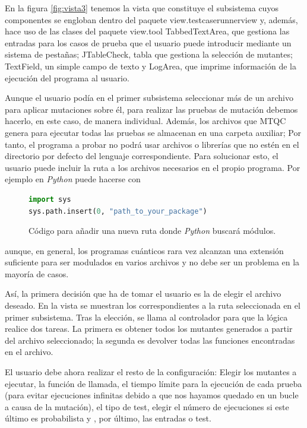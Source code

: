 En la figura \ref{fig:vista3} tenemos la vista que constituye el subsistema cuyos componentes se engloban dentro del paquete view.testcaserunnerview y, además, hace uso de las clases del paquete view.tool TabbedTextArea, que gestiona las entradas para los casos de prueba que el usuario puede introducir mediante un sistema de pestañas; JTableCheck, tabla que gestiona la selección de mutantes; TextField, un simple campo de texto y LogArea, que imprime información de la ejecución del programa al usuario.

Aunque el usuario podía en el primer subsistema seleccionar más de un archivo para aplicar mutaciones sobre él, para realizar las pruebas de mutación debemos hacerlo, en este caso, de manera individual. Además, los archivos que MTQC genera para ejecutar todas las pruebas se almacenan en una carpeta auxiliar; Por tanto, el programa a probar no podrá usar archivos o librerías que no estén en el directorio por defecto del lenguaje correspondiente. Para solucionar esto, el usuario puede incluir la ruta a los archivos necesarios en el propio programa. Por ejemplo en \textit{Python} puede hacerse con

\begin{figure}[htb]
\begin{lstlisting}[language=Python]
import sys
sys.path.insert(0, "path_to_your_package")
\end{lstlisting}
\caption{Código para añadir una nueva ruta donde \textit{Python} buscará módulos.}
\label{fig:code1}
\end{figure}

aunque, en general, los programas cuánticos rara vez alcanzan una extensión suficiente para ser modulados en varios archivos y no debe ser un problema en la mayoría de casos.

Así, la primera decisión que ha de tomar el usuario es la de elegir el archivo deseado. En la vista se muestran los correspondientes a la ruta seleccionada en el primer subsistema. Tras la elección, se llama al controlador para que la lógica realice dos tareas. La primera es obtener todos los mutantes generados a partir del archivo seleccionado; la segunda es devolver todas las funciones encontradas en el archivo.

El usuario debe ahora realizar el resto de la configuración: Elegir los mutantes a ejecutar, la función de llamada, el tiempo límite para la ejecución de cada prueba (para evitar ejecuciones infinitas debido a que nos hayamos quedado en un bucle a causa de la mutación), el tipo de test, elegir el número de ejecuciones si este último es probabilista y , por último, las entradas o test.

